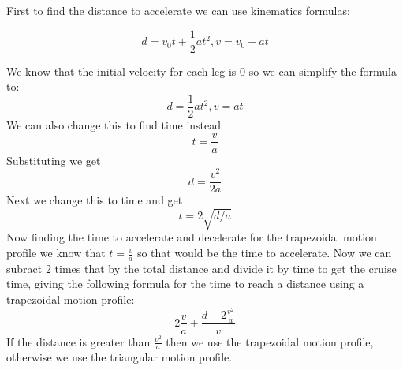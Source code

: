 \documentclass[11pt]{article}
\begin{document}
First to find the distance to accelerate we can use kinematics formulas:

\[
  d = v_{0}t + \frac{1}{2}at^2, v = v_{0} + at
\]

We know that the initial velocity for each leg is 0 so we can simplify the formula to:
\[
  d = \frac{1}{2}at^2, v = at
\]
We can also change this to find time instead
\[
  t = \frac{v}{a}
\]
Substituting we get
\[
  d = \frac{v^2}{2a}
\]
Next we change this to time and get
\[
  t = 2\sqrt{d/a}
\]
Now finding the time to accelerate and decelerate for the trapezoidal motion profile we know that \(t = \frac{v}{a}\) so that would be the time to accelerate. Now we can subract 2 times that by the total distance and divide it by time to get the cruise time, giving the following formula for the time to reach a distance using a trapezoidal motion profile:
\[
  2\frac{v}{a} + \frac{d-2{\frac{v^2}{a}}}{v}
\]
If the distance is greater than \(\frac{v^2}{a}\) then we use the trapezoidal motion profile, otherwise we use the triangular motion profile.
\end{document}
